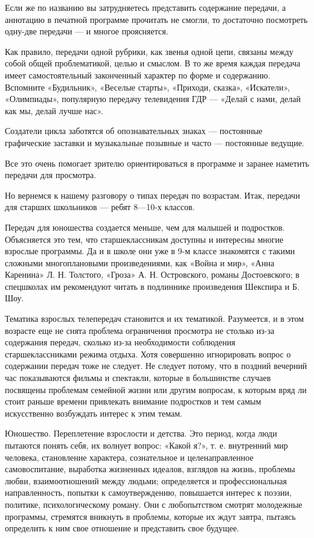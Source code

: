 \documentclass[12pt, a4paper, openany]{book}
\begin{document}
Если же по названию вы затрудняетесь представить содержание передачи, а аннотацию в печатной программе прочитать не смогли, то достаточно посмотреть одну-две передачи — и многое проясняется. 
 
Как правило, передачи одной рубрики, как звенья одной цепи, связаны между собой общей проблематикой, целью и смыслом. В то же время каждая передача имеет самостоятельный законченный характер по форме и содержанию. Вспомните «Будильник», «Веселые старты», «Приходи, сказка», «Искатели», «Олимпиады», популярную передачу телевидения ГДР — «Делай с нами, делай как мы, делай лучше нас». 

Создатели цикла заботятся об опознавательных знаках — постоянные графические заставки и музыкальные позывные и часто — постоянные ведущие. 

Все это очень помогает зрителю ориентироваться в программе и заранее наметить передачи для просмотра. 

Но вернемся к нашему разговору о типах передач по возрастам. Итак, передачи для старших школьников — ребят 8—10-х классов. 

Передач для юношества создается меньше, чем для малышей и подростков. Объясняется это тем, что старшеклассникам доступны и интересны многие взрослые программы. Да и в школе они уже в 9-м классе знакомятся с такими сложными многоплановыми произведениями, как «Война и мир», «Анна Каренина» Л. Н. Толстого, «Гроза» А. Н. Островского, романы Достоевского; в спецшколах им рекомендуют читать в подлиннике произведения Шекспира и Б. Шоу. 

Тематика взрослых телепередач становится и их тематикой. Разумеется, и в этом возрасте еще не снята проблема ограничения просмотра не столько из-за содержания передач, сколько из-за необходимости соблюдения старшеклассниками режима отдыха. Хотя совершенно игнорировать вопрос о содержании передач тоже не следует. Не следует потому, что в поздний вечерний час показываются фильмы и спектакли, которые в большинстве случаев посвящены проблемам семейной жизни или другим вопросам, к которым вряд ли стоит раньше времени привлекать внимание подростков и тем самым искусственно возбуждать интерес к этим темам.

Юношество. Переплетение взрослости и детства. Это период, когда люди пытаются понять себя, их волнует вопрос: «Какой я?», т. е. внутренний мир человека, становление характера, сознательное и целенаправленное самовоспитание, выработка жизненных идеалов, взглядов на жизнь, проблемы любви, взаимоотношений между людьми; определяется и профессиональная направленность, попытки к самоутверждению, повышается интерес к поэзии, политике, психологическому роману. Они с любопытством смотрят молодежные программы, стремятся вникнуть в проблемы, которые их ждут завтра, пытаясь определить к ним свое отношение и представить свое будущее. 
\end{document}
